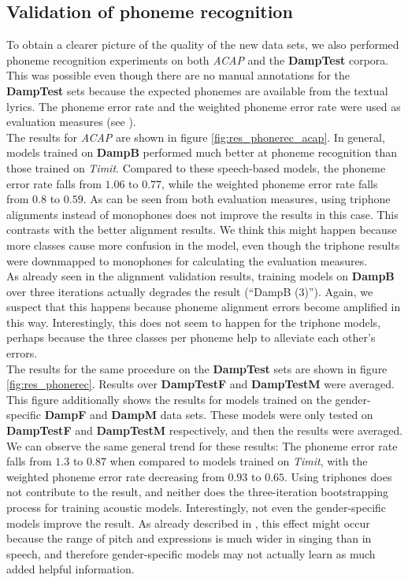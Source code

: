 \subsection{Validation of phoneme recognition}
To obtain a clearer picture of the quality of the new data sets, we also performed phoneme recognition experiments on both \textit{ACAP} and the \textbf{DampTest} corpora. This was possible even though there are no manual annotations for the \textbf{DampTest} sets because the expected phonemes are available from the textual lyrics. The phoneme error rate and the weighted phoneme error rate were used as evaluation measures (see \cite{kruspe_phonerec}).\\
The results for \textit{ACAP} are shown in figure \ref{fig:res_phonerec_acap}. In general, models trained on \textbf{DampB} performed much better at phoneme recognition than those trained on \textit{Timit}. Compared to these speech-based models, the phoneme error rate falls from $1.06$ to $0.77$, while the weighted phoneme error rate falls from $0.8$ to $0.59$. As can be seen from both evaluation measures, using triphone alignments instead of monophones does not improve the results in this case. This contrasts with the better alignment results. We think this might happen because more classes cause more confusion in the model, even though the triphone results were downmapped to monophones for calculating the evaluation measures.\\
As already seen in the alignment validation results, training models on \textbf{DampB} over three iterations actually degrades the result (``DampB (3)''). Again, we suspect that this happens because phoneme alignment errors become amplified in this way. Interestingly, this does not seem to happen for the triphone models, perhaps because the three classes per phoneme help to alleviate each other's errors.\\
The results for the same procedure on the \textbf{DampTest} sets are shown in figure \ref{fig:res_phonerec}. Results over \textbf{DampTestF} and \textbf{DampTestM} were averaged. This figure additionally shows the results for models trained on the gender-specific \textbf{DampF} and \textbf{DampM} data sets. These models were only tested on \textbf{DampTestF} and \textbf{DampTestM} respectively, and then the results were averaged.\\
We can observe the same general trend for these results: The phoneme error rate falls from $1.3$ to $0.87$ when compared to models trained on \textit{Timit}, with the weighted phoneme error rate decreasing from $0.93$ to $0.65$. Using triphones does not contribute to the result, and neither does the three-iteration bootstrapping process for training acoustic models. Interestingly, not even the gender-specific models improve the result. As already described in \cite{kruspe_phonerec}, this effect might occur because the range of pitch and expressions is much wider in singing than in speech, and therefore gender-specific models may not actually learn as much added helpful information.

